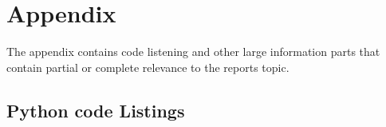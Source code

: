 \section{Appendix} \label{sec: Appendix}
The appendix contains code listening and other large information parts that contain partial or complete relevance to the reports topic. 

\subsection{Python code Listings} \label{subsec: Python code Listings}





